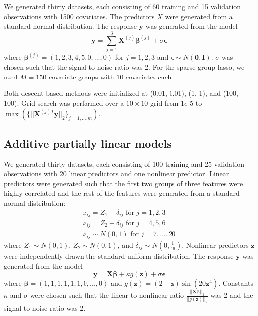 \documentclass[12pt,letterpaper]{article}
\begin{document}
We generated thirty datasets, each consisting of 60 training and 15 validation observations with 1500 covariates. The predictors $X$ were generated from a standard normal distribution. The response $\boldsymbol y$ was generated from the model
\begin{equation}
\boldsymbol y = \sum\limits_{j=1}^3 \boldsymbol X^{(j)} \boldsymbol \beta^{(j)} + \sigma \boldsymbol \epsilon
\end{equation}
where $\boldsymbol \beta^{(j)} = (1, 2, 3, 4, 5, 0, ..., 0)$ for $j = 1, 2, 3$ and $\boldsymbol \epsilon \sim N(\boldsymbol 0, \boldsymbol I)$. $\sigma$ was chosen such that the signal to noise ratio was 2. For the sparse group lasso, we used $M=150$ covariate groups with $10$ covariates each.

Both descent-based methods were initialized at (0.01, 0.01), (1, 1), and (100, 100). Grid search was performed over a $10 \times 10$ grid from 1$e$-5 to $\max(\{||\boldsymbol X^{(j)T} \boldsymbol y ||_2\}_{j=1,..., m})$.

\subsection{Additive partially linear models}\label{sec:simulationAPLM}

We generated thirty datasets, each consisting of 100 training and 25 validation observations with 20 linear predictors and one nonlinear predictor. Linear predictors were generated such that the first two groups of three features were highly correlated and the rest of the features were generated from a standard normal distribution:
\begin{equation}
\begin{array}{c}
x_{ij} = Z_1 + \delta_{ij} \text{ for } j=1, 2, 3 \\
x_{ij} = Z_2 + \delta_{ij} \text{ for } j= 4, 5, 6 \\
x_{ij} \sim N(0,1) \text{ for } j = 7, ..., 20
\end{array}
\end{equation}
where $Z_1 \sim N(0,1)$, $Z_2 \sim N(0,1)$, and $\delta_{ij} \sim N(0, \frac{1}{16})$. Nonlinear predictors $\boldsymbol z$ were independently drawn the standard uniform distribution. The response $\boldsymbol y$ was generated from the model
\begin{equation}
\boldsymbol y = \boldsymbol X \boldsymbol \beta + \kappa g(\boldsymbol z) + \sigma \boldsymbol \epsilon
\end{equation}
where $\boldsymbol \beta = (1, 1, 1, 1, 1, 1, 0, ..., 0)$ and $g(\boldsymbol z) =(2-\boldsymbol z)\sin(20 \boldsymbol z^4)$. Constants $\kappa$ and $\sigma$ were chosen such that the linear to nonlinear ratio $\frac{||\boldsymbol X \boldsymbol \beta||_2}{||g(\boldsymbol z)||_2}$ was 2 and the signal to noise ratio was 2. 
\end{document}
